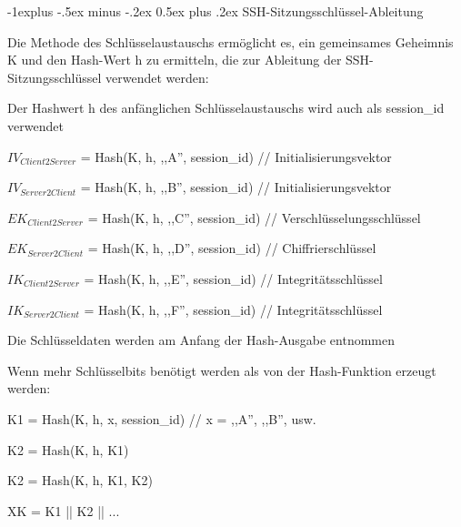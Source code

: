 \documentclass[a4paper]{article}
\makeatletter
\renewcommand{\subsection}{\@startsection{subsection}{2}{0mm}%
 {-1explus -.5ex minus -.2ex}%
 {0.5ex plus .2ex}%
 {\normalfont\normalsize\bfseries}}
\makeatother
\begin{document}
\begin{multicols}{3}
\begin{itemize*}
            \subsection{SSH-Sitzungsschlüssel-Ableitung}
            \begin{itemize*}
                  \item Die Methode des Schlüsselaustauschs ermöglicht es, ein gemeinsames
                  Geheimnis K und den Hash-Wert h zu ermitteln, die zur Ableitung der
                  SSH-Sitzungsschlüssel verwendet werden:
                  \begin{itemize*}
                        \item Der Hashwert h des anfänglichen Schlüsselaustauschs wird auch als session\_id verwendet
                        \item $IV_{Client2Server}$ = Hash(K, h, ,,A'', session\_id) // Initialisierungsvektor
                        \item $IV_{Server2Client}$ = Hash(K, h, ,,B'', session\_id) // Initialisierungsvektor
                        \item $EK_{Client2Server}$ = Hash(K, h, ,,C'', session\_id) // Verschlüsselungsschlüssel
                        \item $EK_{Server2Client}$ = Hash(K, h, ,,D'', session\_id) // Chiffrierschlüssel
                        \item $IK_{Client2Server}$ = Hash(K, h, ,,E'', session\_id) // Integritätsschlüssel
                        \item $IK_{Server2Client}$ = Hash(K, h, ,,F'', session\_id) // Integritätsschlüssel
                  \end{itemize*}
                  \item Die Schlüsseldaten werden am Anfang der Hash-Ausgabe entnommen
                  \item Wenn mehr Schlüsselbits benötigt werden als von der Hash-Funktion
                  erzeugt werden:
                  \begin{itemize*}
                        \item K1 = Hash(K, h, x, session\_id) // x = ,,A'', ,,B'', usw.
                        \item K2 = Hash(K, h, K1)
                        \item K2 = Hash(K, h, K1, K2)
                        \item XK = K1 || K2 || ...
                  \end{itemize*}
            \end{itemize*}


\end{itemize*}
\end{multicols}
\end{document}
